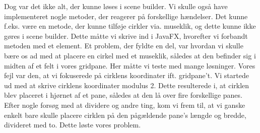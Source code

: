 Dog var det ikke alt, der kunne løses i scene builder. Vi skulle også have implementeret nogle metoder, der reagerer på forskellige hændelser. Det kunne f.eks. være en metode, der kunne tilføje cirkler via. museklik, og dette kunne ikke gøres i scene builder. Dette måtte vi skrive ind i JavaFX, hvorefter vi forbandt metoden med et element. 
\newline
\newline
Et problem, der fyldte en del, var hvordan vi skulle bære os ad med at placere en cirkel med et museklik, således at den befinder sig i midten af et felt i vores gridpane. Her måtte vi teste med mange løsninger. Vores fejl var den, at vi fokuserede på cirklens koordinater ift. gridpane't. Vi startede ud med at skrive cirklens koordinater modulus 2. Dette resulterede i, at cirklen blev placeret i hjørnet af et pane, således at den lå over fire forskellige panes. Efter nogle forsøg med at dividere og andre ting, kom vi frem til, at vi ganske enkelt bare skulle placere cirklen på den pågældende pane's længde og bredde, divideret med to. Dette løste vores problem.